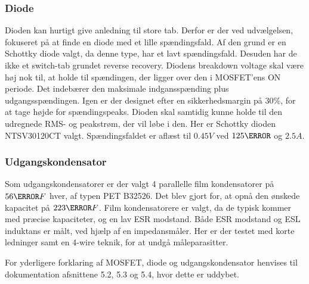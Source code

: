 \subsubsection{Diode}
\noindent Dioden kan hurtigt give anledning til store tab. Derfor er der ved udvælgelsen, fokuseret på at finde en diode med et lille spændingsfald. Af den grund er en Schottky diode valgt, da denne type, har et lavt spændingsfald. Desuden har de ikke et switch-tab grundet reverse recovery. Diodens breakdown voltage skal være høj nok til, at holde til spændingen, der ligger over den i MOSFET'ens ON periode. Det indebærer den maksimale indgansspænding plus udgangsspændingen. Igen er der designet efter en sikkerhedsmargin på $30\percent$, for at tage højde for spændingspeaks. Dioden skal samtidig kunne holde til den udregnede RMS- og peakstrøm, der vil løbe i den. Her er Schottky dioden NTSV30120CT\cite{NTSV30120} valgt. Spændingsfaldet er aflæst til $0.45V$ ved $125\degreeCelsius$ og $2.5A$.  

\subsubsection{Udgangskondensator}
\noindent Som udgangskondensatorer er der valgt 4 parallelle film kondensatorer på $56\micro F$ hver, af typen PET B32526\cite{Kondensator}. Det blev gjort for, at opnå den ønskede kapacitet på $223\micro F$. Film kondensatorere er valgt, da de typisk kommer med præcise kapaciteter, og en lav ESR modstand. Både ESR modstand og ESL induktans er målt, ved hjælp af en impedansmåler. Her er der testet med korte ledninger samt en 4-wire teknik, for at undgå måleparasitter.

For yderligere forklaring af MOSFET, diode og udgangskondensator henvises til dokumentation afsnittene 5.2, 5.3 og 5.4, hvor dette er uddybet.